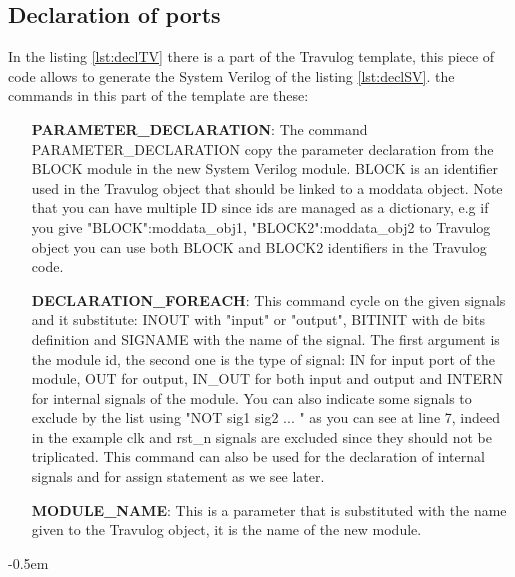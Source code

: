 {{	
    	\subsection{Declaration of ports}{

    		In the listing \ref{lst:declTV} there is a part of the Travulog template, this piece of code allows to generate the System Verilog of the listing \ref{lst:declSV}. the commands in this part of the template are these: 
    		\begin{itemize}
    			\item [\textbf{PARAMETER\_DECLARATION}:] The command PARAMETER\_DECLARATION copy the parameter declaration from the BLOCK module in the new System Verilog module. BLOCK is an identifier used in the Travulog object that should be linked to a moddata object. Note that you can have multiple ID since ids are managed as a dictionary, e.g if you give {"BLOCK":moddata\_obj1, "BLOCK2":moddata\_obj2} to Travulog object you can use both BLOCK and BLOCK2 identifiers in the Travulog code.
    			\item [\textbf{DECLARATION\_FOREACH}:] This command cycle on the given signals and it substitute: INOUT  with "input" or "output",  BITINIT with de bits definition and SIGNAME with the name of the signal. The first argument is the module id, the second one is the type of signal: IN for input port of the module, OUT for output, IN\_OUT for both input and output and INTERN for internal signals of the module. You can also indicate some signals to exclude by the list using "NOT sig1 sig2 ... " as you can see at line 7, indeed in the example clk and rst\_n signals are excluded since they should not be triplicated.
    			This command can also be used for the declaration of internal signals and for assign statement as we see later.
    			\item [\textbf{MODULE\_NAME}:] This is a parameter that is substituted with the name given to the Travulog object, it is the name of the new module.
    		\end{itemize}
    			
    			
    		\openup -0.5em
    		
    		\begin{parcolumns}[colwidths={1=0.54\textwidth}, distance=0.5em]{2}
\end{parcolumns}}}}
